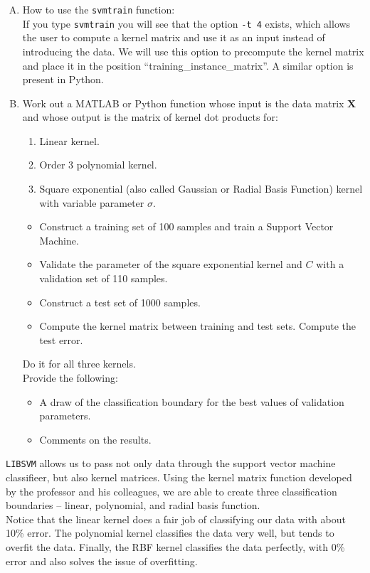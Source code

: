 \documentclass[11pt]{article}
\begin{document}
\begin{enumerate}[A.]
    \item How to use the \texttt{svmtrain} function:\\If you type \texttt{svmtrain} you will see that the option \texttt{-t 4} exists, which allows the user to compute a kernel matrix and use it as an input instead of introducing the data. We will use this option to precompute the kernel matrix and place it in the position ``training\_instance\_matrix''. A similar option is present in Python.
    \item Work out a MATLAB or Python function whose input is the data matrix \( \mathbf{X} \) and whose output is the matrix of kernel dot products for:
    \begin{enumerate}[1.]
        \item Linear kernel.
        \item Order 3 polynomial kernel.
        \item Square exponential (also called Gaussian or Radial Basis Function) kernel with variable parameter \(\sigma\).
    \end{enumerate}
    \begin{itemize}
        \item Construct a training set of 100 samples and train a Support Vector Machine.
        \item Validate the parameter of the square exponential kernel and \(C\) with a validation set of 110 samples.
        \item Construct a test set of 1000 samples.
        \item Compute the kernel matrix between training and test sets. Compute the test error.
    \end{itemize}
    Do it for all three kernels.\\[1em]
    Provide the following:
    \begin{itemize}
        \item A draw of the classification boundary for the best values of validation parameters.
        \item Comments on the results.
    \end{itemize}
\end{enumerate}

\begin{tcolorbox}[colback=CrispBlue!5!white,colframe=CrispBlue!75!black,title=Nonlinear SVM Classifier.]
\texttt{LIBSVM} allows us to pass not only data through the support vector machine classifieer, but also kernel matrices. Using the kernel matrix function developed by the professor and his colleagues, we are able to create three classification boundaries -- linear, polynomial, and radial basis function.\\

Notice that the linear kernel does a fair job of classifying our data with about 10\% error. The polynomial kernel classifies the data very well, but tends to overfit the data. Finally, the RBF kernel classifies the data perfectly, with 0\% error and also solves the issue of overfitting.

\end{tcolorbox}
\end{document}
